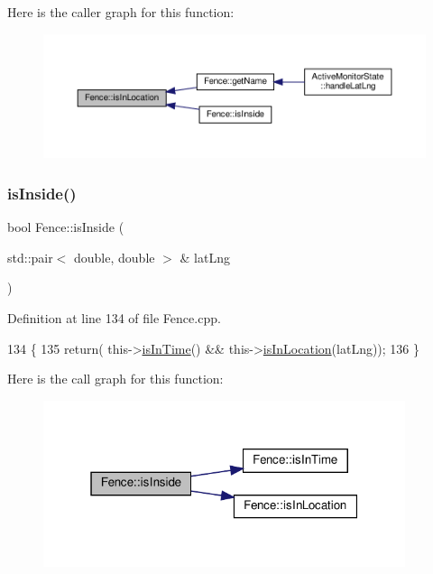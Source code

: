 Here is the caller graph for this function\+:
\nopagebreak
\begin{figure}[H]
\begin{center}
\leavevmode
\includegraphics[width=350pt]{d0/db8/class_fence_a80fb7fbb60592d3e8afc0ecb5122b987_icgraph}
\end{center}
\end{figure}
\mbox{\label{class_fence_a224ef2ce3f97de067f996b4722c66797}} 
\subsubsection{\texorpdfstring{is\+Inside()}{isInside()}}
{\footnotesize\ttfamily bool Fence\+::is\+Inside (\begin{DoxyParamCaption}\item[{std\+::pair$<$ double, double $>$ \&}]{lat\+Lng }\end{DoxyParamCaption})}



Definition at line 134 of file Fence.\+cpp.


\begin{DoxyCode}
134                                                     \{
135     \textcolor{keywordflow}{return}( this->\hyperlink{class_fence_a7695b0f94f461369703188a287a38ab4}{isInTime}() && this->\hyperlink{class_fence_a80fb7fbb60592d3e8afc0ecb5122b987}{isInLocation}(latLng));
136 \}
\end{DoxyCode}
Here is the call graph for this function\+:
\nopagebreak
\begin{figure}[H]
\begin{center}
\leavevmode
\includegraphics[width=301pt]{d0/db8/class_fence_a224ef2ce3f97de067f996b4722c66797_cgraph}
\end{center}
\end{figure}
\mbox{\label{class_fence_a7695b0f94f461369703188a287a38ab4}} 
